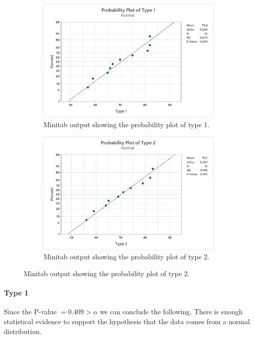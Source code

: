 \documentclass{article}
\begin{document}
\begin{figure}[h]
    \centering
    \begin{subfigure}[b]{0.4\textwidth}
        \includegraphics[width=1.25\textwidth]{./images/3_c_1.png}
        \caption{Minitab output showing the probability plot of type 1.}
      \label{fig:img1}
    \end{subfigure}
    \hfill
    \begin{subfigure}[b]{0.4\textwidth}
        \includegraphics[width=1.25\textwidth]{./images/3_c_2.png}
        \caption{Minitab output showing the probability plot of type 2.}
      \label{fig:img2}
    \end{subfigure}
    \label{fig:both}
  \end{figure}

  \paragraph{Type 1} Since the P-value $= 0.409 > \alpha$ we can conclude the following. There is enough statistical evidence to support the hypothesis that the data comes from a normal distribution.
\end{document}
